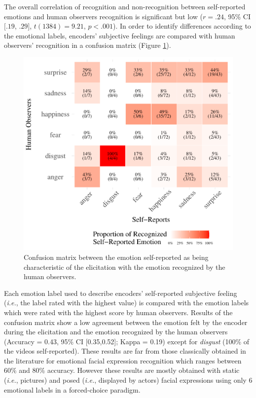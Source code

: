 \documentclass[
  english,
  doc]{apa7}
\begin{document}
The overall correlation of recognition and non-recognition between self-reported emotions and human observers recognition is significant but low (\(r = .24\), 95\% CI \([.19\), \(.29]\), \(t(1384) = 9.21\), \(p < .001\)). In order to identify differences according to the emotional labels, encoders' subjective feelings are compared with human observers' recognition in a confusion matrix (Figure \ref{fig:confusionMatrix-sr-hr}).

\begin{figure}[!h]
\includegraphics[width=\textwidth]{manuscript_apa_files/figure-latex/confusionMatrix-sr-hr-1} \caption{Confusion matrix between the emotion self-reported as being characteristic of the elicitation with the emotion recognized by the human observers.}\label{fig:confusionMatrix-sr-hr}
\end{figure}

Each emotion label used to describe encoders' self-reported subjective feeling (\emph{i.e.}, the label rated with the highest value) is compared with the emotion labels which were rated with the highest score by human observers. Results of the confusion matrix show a low agreement between the emotion felt by the encoder during the elicitation and the emotion recognized by the human observers (Accuracy = 0.43, 95\% CI {[}0.35,0.52{]}; Kappa = 0.19) except for \emph{disgust} (100\% of the videos self-reported). These results are far from those classically obtained in the literature for emotional facial expression recognition which ranges between 60\% and 80\% accuracy. However these results are mostly obtained with static (\emph{i.e.}, pictures) and posed (\emph{i.e.}, displayed by actors) facial expressions using only 6 emotional labels in a forced-choice paradigm.
\end{document}
